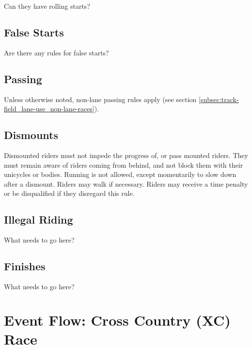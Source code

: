 \begin{framed}
Can they have rolling starts?
\end{framed}

\subsection{False Starts}

\begin{framed}
Are there any rules for false starts?
\end{framed}

\subsection{Passing}

Unless otherwise noted, non-lane passing rules apply (see section \ref{subsec:track-field_lane-use_non-lane-races}).

\subsection{Dismounts}

Dismounted riders must not impede the progress of, or pass mounted riders.
They must remain aware of riders coming from behind, and not block them with their
unicycles or bodies.
Running is not allowed, except momentarily to slow down after a dismount.
Riders may walk if necessary.
Riders may receive a time penalty or be disqualified if they disregard this rule.

\subsection{Illegal Riding}

\begin{framed}
What needs to go here?
\end{framed}

\subsection{Finishes}

\begin{framed}
What needs to go here?
\end{framed}

\section{Event Flow: Cross Country (XC) Race\label{sec:muni_xc}}

